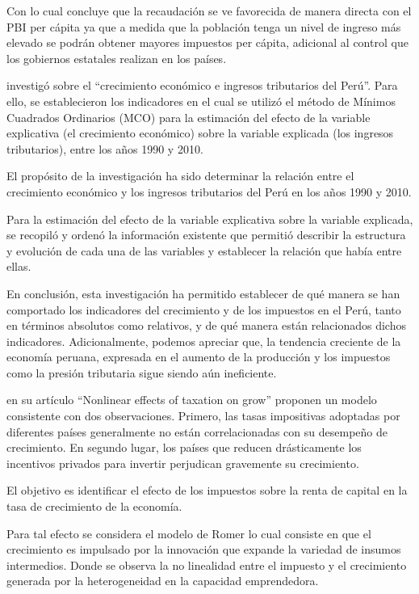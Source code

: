 \documentclass[
  letterpaper,
  DIV=11,
  numbers=noendperiod]{scrartcl}
\begin{document}
Con lo cual concluye que la recaudación se ve favorecida de manera
directa con el PBI per cápita ya que a medida que la población tenga un
nivel de ingreso más elevado se podrán obtener mayores impuestos per
cápita, adicional al control que los gobiernos estatales realizan en los
países.

\textcite{ordonez_crecimiento_2014} investigó sobre el ``crecimiento
económico e ingresos tributarios del Perú''. Para ello, se establecieron
los indicadores en el cual se utilizó el método de Mínimos Cuadrados
Ordinarios (MCO) para la estimación del efecto de la variable
explicativa (el crecimiento económico) sobre la variable explicada (los
ingresos tributarios), entre los años 1990 y 2010.

El propósito de la investigación ha sido determinar la relación entre el
crecimiento económico y los ingresos tributarios del Perú en los años
1990 y 2010.

Para la estimación del efecto de la variable explicativa sobre la
variable explicada, se recopiló y ordenó la información existente que
permitió describir la estructura y evolución de cada una de las
variables y establecer la relación que había entre ellas.

En conclusión, esta investigación ha permitido establecer de qué manera
se han comportado los indicadores del crecimiento y de los impuestos en
el Perú, tanto en términos absolutos como relativos, y de qué manera
están relacionados dichos indicadores. Adicionalmente, podemos apreciar
que, la tendencia creciente de la economía peruana, expresada en el
aumento de la producción y los impuestos como la presión tributaria
sigue siendo aún ineficiente.

\textcite{jaimovich_nonlinear_2017} en su artículo ``Nonlinear effects
of taxation on grow'' proponen un modelo consistente con dos
observaciones. Primero, las tasas impositivas adoptadas por diferentes
países generalmente no están correlacionadas con su desempeño de
crecimiento. En segundo lugar, los países que reducen drásticamente los
incentivos privados para invertir perjudican gravemente su crecimiento.

El objetivo es identificar el efecto de los impuestos sobre la renta de
capital en la tasa de crecimiento de la economía.

Para tal efecto se considera el modelo de Romer lo cual consiste en que
el crecimiento es impulsado por la innovación que expande la variedad de
insumos intermedios. Donde se observa la no linealidad entre el impuesto
y el crecimiento generada por la heterogeneidad en la capacidad
emprendedora.
\end{document}
